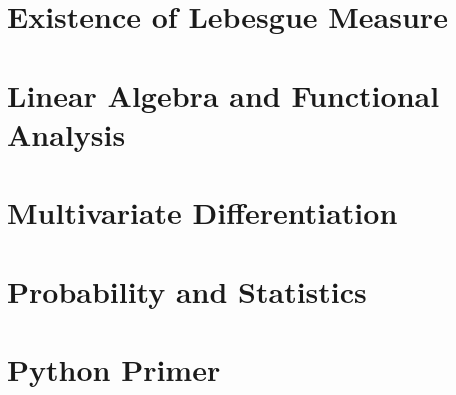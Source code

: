 \documentclass[12pt, a4paper]{article}
\begin{document}
\section{Existence of Lebesgue Measure}
%

\section{Linear Algebra and Functional Analysis}
%

\section{Multivariate Differentiation}
%

\section{Probability and Statistics}
%

\section{Python Primer}
%
\end{document}
